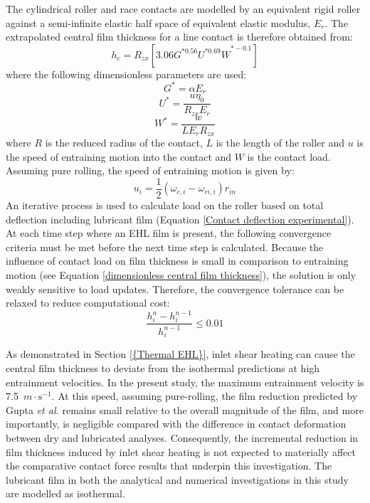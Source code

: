\begin{enumerate}
	The cylindrical roller and race contacts are modelled by an equivalent rigid roller against a semi-infinite elastic half space of equivalent elastic modulus, $E_r$. The extrapolated central film thickness for a line contact is therefore obtained \cite{Dowson1979} from:  
	\begin{equation}\label{dimensionless central film thickness}
	h_c=R_{zx}\left[{3.06G}^{\ast0.56}{U^{\ast0.69}W}^{\ast-0.1}\right]
    \end{equation}
	where the following dimensionless parameters are used:
	\begin{equation}\label{Gstar}
		G^*=\alpha E_r 
	\end{equation}
	\begin{equation}\label{Ustar}
		U^*=\frac{u \eta_0}{R_{z x} E_r}
	\end{equation}
	\begin{equation}\label{Wstar}
		W^*=\frac{w}{L E_r R_{z x}}
	\end{equation}
	where $R$ is the reduced radius of the contact, $L$ is the length of the roller and $u$ is the speed of entraining motion into the contact and $W$ is the contact load. Assuming pure rolling, the speed of entraining motion is given by:
	\begin{equation}\label{entraining motion speed}
		u_i=\frac{1}{2}\left(\omega_{c, i}-\omega_{r i, i}\right) r_{i n}
	\end{equation}
	An iterative process is used to calculate load on the roller based on total deflection including lubricant film (Equation \ref{Contact deflection experimental}). At each time step where an EHL film is present, the following convergence criteria must be met before the next time step is calculated. Because the influence of contact load on film thickness is small in comparison to entraining motion (see Equation \ref{dimensionless central film thickness}), the solution is only weakly sensitive to load updates. Therefore, the convergence tolerance can be relaxed to reduce computational cost:
	\begin{equation}\label{film convergence}
		\frac{h_i^n-h_i^{n-1}}{h_i^{n-1}} \leq 0.01
	\end{equation}
\end{enumerate}

As demonstrated in Section \ref{{Thermal EHL}}, inlet shear heating can cause the central film thickness to deviate from the isothermal predictions at high entrainment velocities. In the present study, the maximum entrainment velocity is 7.5~$m \cdot \mathrm{s}^{-1}$. At this speed, assuming pure-rolling, the film reduction predicted by Gupta \textit{et al.} \cite{Gupta1992} remains small relative to the overall magnitude of the film, and more importantly, is negligible compared with the difference in contact deformation between dry and lubricated analyses. Consequently, the incremental reduction in film thickness induced by inlet shear heating is not expected to materially affect the comparative contact force results that underpin this investigation. The lubricant film in both the analytical and numerical investigations in this study are modelled as isothermal.

